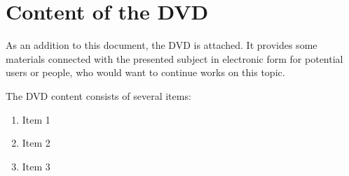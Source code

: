 \chapter{Content of the DVD}

As an addition to this document, the DVD is attached. It provides some materials connected with the presented subject in electronic form for potential users or people, who would want to continue works on this topic. 

The DVD content consists of several items:

\begin{enumerate}
\item Item 1
\item Item 2
\item Item 3
\end{enumerate}

